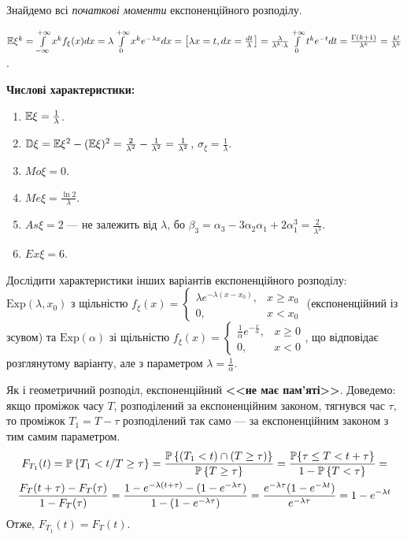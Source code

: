 Знайдемо всі \emph{початкові моменти} експоненційного розподілу.

$\E\xi^k = \int\limits_{-\infty}^{+\infty} x^k f_\xi(x)dx = \lambda \int\limits_{0}^{+\infty} x^k e^{-\lambda x}dx = \left[ \lambda x = t, dx = \frac{dt}{\lambda}\right]=
\frac{\lambda}{\lambda^k \cdot \lambda} \int\limits_{0}^{+\infty} t^k e^{-t} dt = \frac{\Gamma(k+1)}{\lambda^k} = \frac{k!}{\lambda^k}$.

\noindent\textbf{Числові характеристики:}
\begin{enumerate}
    \item $\E\xi = \frac{1}{\lambda}$.
    \item $\D\xi = \E\xi^2 - (\E\xi)^2 = \frac{2}{\lambda^2} - \frac{1}{\lambda^2} = \frac{1}{\lambda^2}$, $\sigma_\xi = \frac{1}{\lambda}$.
    \item ${Mo}\xi = 0$.
    \item ${Me}\xi = \frac{\ln2}{\lambda}$.
    \item ${As}\xi = 2$ --- не залежить від $\lambda$, бо $\beta_3 = \alpha_3 - 3\alpha_2 \alpha_1 + 2 \alpha_1^3 = \frac{2}{\lambda^3}$.
    \item ${Ex}\xi = 6$.
\end{enumerate}

\begin{exercise}
    Дослідити характеристики інших варіантів експоненційного розподілу:
    $\mathrm{Exp}(\lambda, x_0)$ з щільністю $f_\xi(x) = \begin{cases}
        \lambda e^{-\lambda (x-x_0)}, & x \geq x_0 \\
        0, & x < x_0
    \end{cases}$ (експоненційний із зсувом) та $\mathrm{Exp}(\alpha)$ зі щільністю
    $f_\xi(x) = \begin{cases}
        \frac{1}{\alpha} e^{-\frac{x}{\alpha}}, & x \geq 0 \\
        0, & x < 0
    \end{cases}$, що відповідає розглянутому варіанту, але з параметром $\lambda = \frac{1}{\alpha}$.
\end{exercise}

Як і геометричний розподіл, експоненційний \textbf{<<не має пам'яті>>}.
Доведемо: якщо проміжок часу $T$, розподілений за експоненційним законом,
тягнувся час $\tau$, то проміжок $T_1 = T - \tau$ розподілений так само --- 
за експоненційним законом з тим самим параметром.
\begin{gather*}
    F_{T_1}(t) = \P\left\{T_1 < t / T \geq \tau\right\} = 
    \frac{\P\left\{(T_1 < t) \cap (T \geq \tau)\right\}}{\P\left\{ T \geq \tau \right\}} =
    \frac{\P{\left\{\tau \leq T < t +\tau\right\}}}{1 - \P\left\{ T < \tau \right\}} = \\
    \frac{F_T(t+\tau) - F_T(\tau)}{1-F_T(\tau)} = 
    \frac{1-e^{-\lambda (t+\tau)} - (1 - e^{-\lambda \tau})}{1-(1-e^{-\lambda \tau})} =
    \frac{e^{-\lambda \tau}(1-e^{-\lambda t})}{e^{-\lambda \tau}} = 1-e^{-\lambda t}
\end{gather*}
Отже, $F_{T_1}(t) = F_T(t)$.

